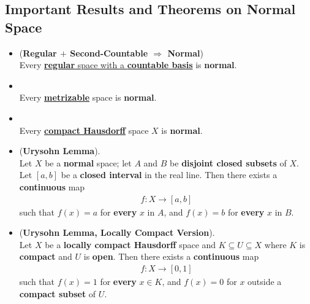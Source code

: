 \documentclass[11pt]{article}
\begin{document}
\subsection{Important Results and Theorems on Normal Space}
\begin{itemize}
\item \begin{theorem} (\textbf{Regular $+$ Second-Countable $\Rightarrow$ Normal})\citep{munkres2000topology}\\
Every \underline{\textbf{regular} space with a \textbf{countable basis}} is \textbf{normal}.
\end{theorem}


\item \begin{theorem} \citep{munkres2000topology}\\
Every \underline{\textbf{metrizable}} space is \textbf{normal}.
\end{theorem}


\item \begin{theorem} \citep{munkres2000topology, reed1980methods}\\
Every \underline{\textbf{compact Hausdorff}} space $X$ is \textbf{normal}.
\end{theorem}


\item \begin{theorem} (\textbf{Urysohn Lemma}). \citep{munkres2000topology}\\
Let $X$ be a \textbf{normal} space; let $A$ and $B$ be \textbf{disjoint closed subsets} of $X$. Let $[a, b]$ be a \textbf{closed interval} in the real line. Then there exists a \textbf{continuous} map
\begin{align*}
f : X \rightarrow [a, b]
\end{align*}
such that $f(x) = a$ for \textbf{every} $x$ in $A$, and $f(x) = b$ for \textbf{every} $x$ in $B$.
\end{theorem}

\item \begin{theorem}  (\textbf{Urysohn Lemma, Locally Compact Version}). \citep{folland2013real}\\ 
Let $X$ be a \textbf{locally compact Hausdorff} space and $K \subseteq U \subseteq X$ where $K$ is \textbf{compact} and $U$ is \textbf{open}.  Then there exists a \textbf{continuous} map
\begin{align*}
f : X \rightarrow [0, 1]
\end{align*}
such that $f(x) = 1$ for \textbf{every} $x \in K$, and $f(x) = 0$ for $x$ outside a \textbf{compact subset} of $U$.
\end{theorem}



\end{itemize}
\end{document}
